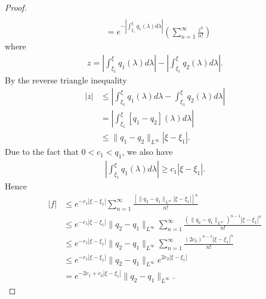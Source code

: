 \documentclass[12pt,reqno]{amsart}
\numberwithin{equation}{section}  %
\numberwithin{figure}{section}
\begin{document}
\begin{proof}
\begin{equation*}
\begin{split}
    \\
    & = e^{- | \int_{\xi_{1}}^{\xi} q_{1}(\lambda) d \lambda |} \left(
    \sum_{n = 1}^{\infty} \frac{z^{n}}{n!}
    \right)
\end{split}
\end{equation*}
%
%
where
%
%
\begin{equation*}
\begin{split}
  z = | \int_{\xi_{1}}^{\xi} q_{1}(\lambda)d \lambda | - | \int_{\xi_{1}}^{\xi} q_{2}(\lambda) d \lambda |.
\end{split}
\end{equation*}
%
%
By the reverse triangle inequality
%
%
\begin{equation*}
\begin{split}
| z | & \le | \int_{\xi_{1}}^{\xi} q_{1}(\lambda)d \lambda  -  \int_{\xi_{1}}^{\xi} q_{2}(\lambda) d \lambda |
\\
& = | \int_{\xi_{1}}^{\xi} [q_{1} -  q_{2}](\lambda) d \lambda |
\\
& \le \| q_{1} - q_{2} \|_{L^{\infty}} | \xi - \xi_{1} |.
\end{split}
\end{equation*}
%
%
Due to the fact
that $0 < c_{1} <q_{1}$, we also have
%
%
\begin{equation*}
\begin{split}
  | \int_{\xi_{1}}^{\xi} q_{1}(\lambda) d \lambda | \ge c_{1} | \xi - \xi_{1} |.
\end{split}
\end{equation*}
%
%
Hence
%
%
%
\begin{equation*}
\begin{split}
  | f | &  \le e^{-c_{1} | \xi - \xi_{1} |} \sum_{n = 1}^{\infty} \frac{\left[ \| q_{2} - q_{1} \|_{L^{\infty}}| \xi - \xi_{1} | \right]^{n}}{n!}
  \\
  & \le e^{-c_{1} | \xi - \xi_{1} |} \| q_{2} - q_{1} \|_{L^{\infty}} \sum_{n =
  1}^{\infty} \frac{(\| q_{2} - q_{1} \|_{L^{\infty}})^{n-1}| \xi - \xi_{1} |^{n}
    }{n!}
\\
&  \le e^{-c_{1} | \xi - \xi_{1} |} \| q_{2} - q_{1} \|_{L^{\infty}} \sum_{n =
1}^{\infty} \frac{(2c_{2} )^{n-1}| \xi - \xi_{1} |^{n}
    }{n!}
    \\
    & \le e^{-c_{1}| \xi - \xi_{1} |} \| q_{2} - q_{1} \|_{L^{\infty}} e^{2c_{2}| \xi - \xi_{1} |}
    \\
    & = e^{-2c_{1} + c_{2}| \xi - \xi_{1} |} \| q_{2} - q_{1} \|_{L^{\infty}}.
\end{split}
\end{equation*}

\end{proof}
\end{document}
